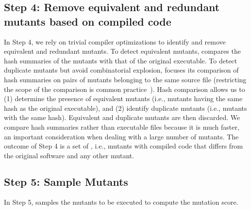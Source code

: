 \subsection{Step 4: Remove equivalent and redundant mutants based on compiled code}

In Step 4, we rely on trivial compiler optimizations to identify and remove equivalent and redundant mutants. 
To detect equivalent mutants, \APPR compares the hash summaries of the mutants with that of the original executable. To detect duplicate mutants but avoid combinatorial explosion, \APPR focuses its comparison of hash summaries on pairs of mutants belonging to the same source file (restricting the scope of the comparison is common practice~\cite{kintis2017detecting}).
Hash comparison allows us to (1) determine the presence of equivalent mutants (i.e., mutants having the same hash as the original executable), and (2) identify duplicate mutants (i.e., mutants with the same hash). %
Equivalent and duplicate mutants are then discarded. We compare hash summaries rather than executable files because it is much faster, an important consideration when dealing with a large number of mutants.
The outcome of Step 4 is a set of , i.e., mutants with compiled code that differs from the original software and any other mutant.


\subsection{Step 5: Sample Mutants}
\label{sec:codeDriven:samplingStep}
\STARTCHANGEDNOV


In Step 5, \APPR samples the mutants to be executed to compute the mutation score. 

